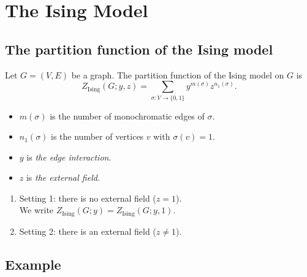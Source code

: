 \section{The Ising Model}

\subsection{The partition function of the Ising model}

\begin{frame}
  \begin{definition}
    Let $G = (V, E)$ be a graph. The partition function of the Ising model on $G$ is
    \begin{equation*}
      Z_{\text{Ising}}(G; y, z) = \sum_{\sigma \colon V \to \{0,1\}} y^{m(\sigma)} z^{n_1(\sigma)}.
    \end{equation*}
  \end{definition}
  
  \begin{itemize}
   \item $m(\sigma)$ is the number of monochromatic edges of $\sigma$.
   \item $n_1(\sigma)$ is the number of vertices $v$ with $\sigma(v) = 1$.
  \item $y$ is \emph{the edge interaction}.
  \item $z$ is \emph{the external field}.
  \end{itemize}
  
  \begin{enumerate}
  	\item Setting 1: there is no external field ($z = 1$).  \\
  	We write $Z_{\text{Ising}}(G; y) = Z_{\text{Ising}}(G; y, 1)$.
  	\item Setting 2: there is an external field ($z \ne 1$).  	
  \end{enumerate}
  
  
\end{frame}

\subsection{Example}

